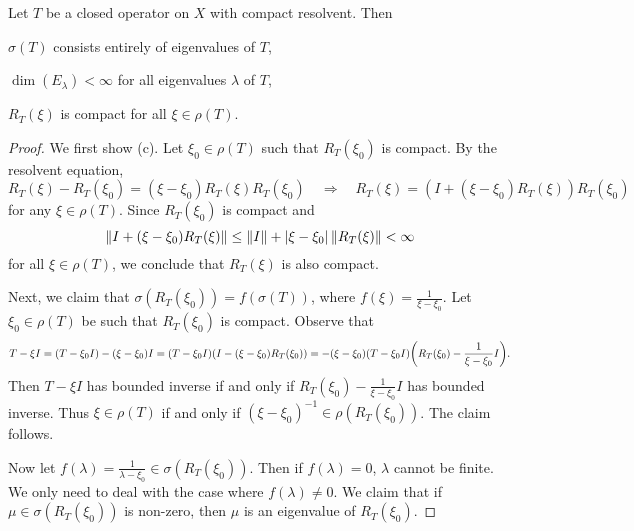 \begin{theorem}\label{thm:compact_resolvent}
    Let $T$ be a closed operator on $X$ with compact resolvent. 
    Then
    \begin{thmenum}
        \item $\sigma(T)$ consists entirely of eigenvalues of $T$, 
        \item $\dim(E_\lambda)<\infty$ for all eigenvalues $\lambda$ of $T$, 
        \item $R_T(\xi)$ is compact for all $\xi\in\rho(T)$.
    \end{thmenum}
\end{theorem}
\begin{proof}
    We first show (c). Let $\xi_0\in\rho(T)$ such that 
    $R_T(\xi_0)$ is compact. By the resolvent equation, 
    \begin{equation*}
        R_T(\xi) - R_T(\xi_0) = (\xi - \xi_0)R_T(\xi)R_T(\xi_0)
        \quad\Rightarrow\quad 
        R_T(\xi) = (I + (\xi - \xi_0)R_T(\xi))R_T(\xi_0)
    \end{equation*}
    for any $\xi\in\rho(T)$. Since $R_T(\xi_0)$ is compact and 
    \begin{equation*}
        \left\lVert {I+(\xi - \xi_0)R_T(\xi)} \right\rVert \leq \left\lVert {I} \right\rVert + \left\lvert {\xi - \xi_0} \right\rvert\left\lVert {R_T(\xi)} \right\rVert < \infty
    \end{equation*}
    for all $\xi\in\rho(T)$, we conclude that $R_T(\xi)$ is also 
    compact. 

    Next, we claim that $\sigma(R_T(\xi_0)) = f(\sigma(T))$, where $f(\xi) = \frac{1}{\xi-\xi_0}$.
    Let $\xi_0\in\rho(T)$ be such that $R_T(\xi_0)$ is compact. Observe that 
    \begin{equation*}
        T-\xi I = (T-\xi_0 I) - (\xi - \xi_0)I = (T-\xi_0 I)(I - (\xi - \xi_0)R_T(\xi_0)) 
        = -(\xi - \xi_0)(T - \xi_0 I)\pth{R_T(\xi_0) - \frac{1}{\xi-\xi_0}I}.
    \end{equation*}
    Then $T-\xi I$ has bounded inverse if and only if $R_T(\xi_0) - \frac{1}{\xi-\xi_0}I$ 
    has bounded inverse. Thus $\xi\in\rho(T)$ if and only if $(\xi - \xi_0)^{-1} \in\rho(R_T(\xi_0))$. 
    The claim follows. 

    Now let $f(\lambda) = \frac{1}{\lambda - \xi_0}\in\sigma(R_T(\xi_0))$. 
    Then if $f(\lambda) = 0$, $\lambda$ cannot be finite. We only need to 
    deal with the case where $f(\lambda)\neq 0$. We claim that if $\mu\in\sigma(R_T(\xi_0))$ 
    is non-zero, then $\mu$ is an eigenvalue of $R_T(\xi_0)$. 


\end{proof}
